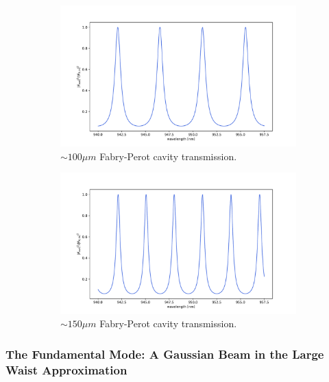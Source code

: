 \begin{figure}[h!]
    \centering
    \begin{subfigure}[b]{0.49\textwidth}
        \includegraphics[width=\textwidth]{figures/100um_broadband_trans.pdf}
        \caption{$\sim 100 \mu m$ Fabry-Perot cavity transmission.}
    \end{subfigure}
    \begin{subfigure}[b]{0.49\textwidth}
        \includegraphics[width=\textwidth]{figures/150um_broadband_trans.pdf}
        \caption{$\sim 150 \mu m$ Fabry-Perot cavity transmission.}
    \end{subfigure}
    \caption{}
    \label{fig:fabry_perot_FSR_comparison}
\end{figure}


\subsubsection{The Fundamental Mode: A Gaussian Beam in the Large Waist Approximation}

